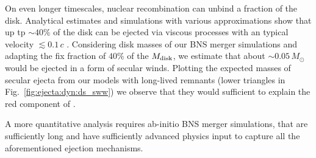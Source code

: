 On even longer timescales, 
nuclear recombination can unbind a fraction of the disk.  
%
Analytical estimates and simulations with various approximations show that 
up tp ${\sim}40\%$ of the disk can be ejected via viscous processes with an 
typical velocity ${\lesssim}0.1\,c$ 
\citep[\eg][]{Siegel:2017nub,Fujibayashi:2017puw,Fernandez:2018kax,
    Radice:2018xqa,Fujibayashi:2020dvr}. 
%
Considering disk masses of our \ac{BNS} merger simulations and 
adapting the fix fraction of $40\%$ of the $M_{\rm disk}$, we estimate 
that about ${\sim}0.05\, M_{\odot}$ would be ejected in a form of 
secular winds. 
%
Plotting the expected masses of secular ejecta from our models with long-lived 
remnants (lower triangles in Fig.~\ref{fig:ejecta:dyn:ds_sww})  
we observe that they would sufficient to explain the red component of 
\AT{}. 


A more quantitative analysis requires ab-initio \ac{BNS} merger simulations, 
that are sufficiently long and have sufficiently advanced physics input to 
capture all the aforementioned ejection mechanisms. 








%
%




